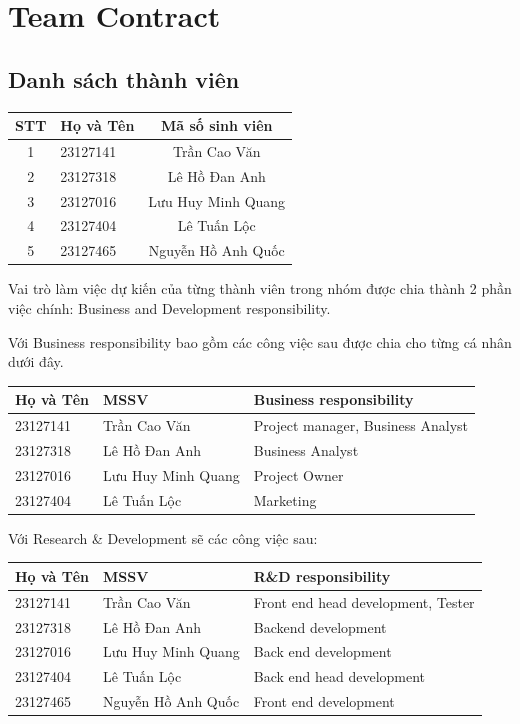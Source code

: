 \section{Team Contract}
\subsection{Danh sách thành viên}


\vspace{0.25cm}
\begin{tabular}{c l c}
\toprule
\textbf{STT} & \textbf{Họ và Tên} & \textbf{Mã số sinh viên} \\
\midrule
1 & 23127141 & Trần Cao Văn \\
2 & 23127318 & Lê Hồ Đan Anh \\
3 & 23127016 & Lưu Huy Minh Quang \\
4 & 23127404 & Lê Tuấn Lộc \\
5 & 23127465 & Nguyễn Hồ Anh Quốc \\
\bottomrule
\end{tabular}

Vai trò làm việc dự kiến của từng thành viên trong nhóm được chia thành 2 phần việc chính: Business and Development responsibility.

Với Business responsibility bao gồm các công việc sau được chia cho từng cá nhân dưới đây.

\vspace{0.25cm}
\begin{tabular}{l l l}
\toprule
\textbf{Họ và Tên} & \textbf{MSSV} & \textbf{Business responsibility} \\
\midrule
23127141 & Trần Cao Văn & Project manager, Business Analyst \\
23127318 & Lê Hồ Đan Anh & Business Analyst \\
23127016 & Lưu Huy Minh Quang & Project Owner \\
23127404 & Lê Tuấn Lộc & Marketing \\
\bottomrule
\end{tabular}

Với Research \& Development sẽ các công việc sau:

\vspace{0.25cm}
\begin{tabular}{l l l}
\toprule
\textbf{Họ và Tên} & \textbf{MSSV} & \textbf{R\&D responsibility} \\
\midrule
23127141 & Trần Cao Văn & Front end head development, Tester \\
23127318 & Lê Hồ Đan Anh & Backend development \\
23127016 & Lưu Huy Minh Quang & Back end development \\
23127404 & Lê Tuấn Lộc & Back end head development \\
23127465 & Nguyễn Hồ Anh Quốc & Front end development\\
\bottomrule
\end{tabular}

